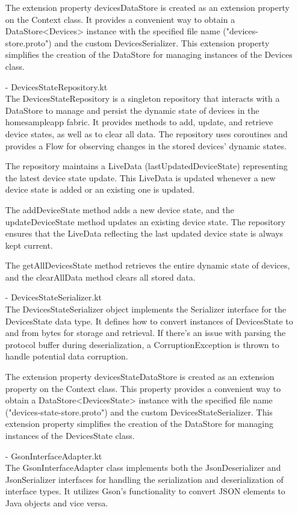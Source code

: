 \begin{enumerate}
            The extension property devicesDataStore is created as an extension property on the Context class. It provides a convenient way to obtain a DataStore<Devices> instance with the specified file name ("devices-store.proto") and the custom DevicesSerializer. This extension property simplifies the creation of the DataStore for managing instances of the Devices class.\\
      \item[-] DevicesStateRepository.kt\\
            The DevicesStateRepository is a singleton repository that interacts with a DataStore to manage and persist the dynamic state of devices in the homesampleapp fabric. It provides methods to add, update, and retrieve device states, as well as to clear all data. The repository uses coroutines and provides a Flow for observing changes in the stored devices' dynamic states.

            The repository maintains a LiveData (lastUpdatedDeviceState) representing the latest device state update. This LiveData is updated whenever a new device state is added or an existing one is updated.

            The addDeviceState method adds a new device state, and the updateDeviceState method updates an existing device state. The repository ensures that the LiveData reflecting the last updated device state is always kept current.

            The getAllDevicesState method retrieves the entire dynamic state of devices, and the clearAllData method clears all stored data.\\
      \item[-] DevicesStateSerializer.kt\\
            The DevicesStateSerializer object implements the Serializer interface for the DevicesState data type. It defines how to convert instances of DevicesState to and from bytes for storage and retrieval. If there's an issue with parsing the protocol buffer during deserialization, a CorruptionException is thrown to handle potential data corruption.

            The extension property devicesStateDataStore is created as an extension property on the Context class. This property provides a convenient way to obtain a DataStore<DevicesState> instance with the specified file name ("devices-state-store.proto") and the custom DevicesStateSerializer. This extension property simplifies the creation of the DataStore for managing instances of the DevicesState class.\\
      \item[-] GsonInterfaceAdapter.kt\\
            The GsonInterfaceAdapter class implements both the JsonDeserializer and JsonSerializer interfaces for handling the serialization and deserialization of interface types. It utilizes Gson's functionality to convert JSON elements to Java objects and vice versa.


\end{enumerate}
